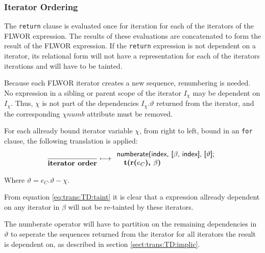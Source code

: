 \subsubsection{Iterator Ordering}
The \texttt{return} clause is evaluated once for iteration for each of the iterators of the FLWOR expression. The
results of these evaluations are concatenated to form the result of the FLWOR expression. If the \texttt{return}
expression is not dependent on a iterator, its relational form will not have a representation for each
of the iterators iterations and will have to be tainted.

Because each FLWOR iterator creates a new sequence, renumbering is needed. No expression in a sibling or parent
scope of the iterator $I_{\chi}$ may be dependent on $I_{\chi}$. Thus, $\chi$ is not part of the dependencies
$I_{\chi}.\vartheta$ returned from the iterator, and the corresponding $\chi{numb}$ attribute must be removed. 

For each allready bound iterator variable $\chi$, from right to left, bound in an \texttt{for} clause,
the following translation is applied:
\begin{equation}
\frac{}{\mbox{\textbf{iterator order}}}
\longmapsto
\begin{array}{l}
\mbox{\textsf{numberate(index, [}}\beta\mbox{\textsf{, index], [}}\vartheta\mbox{\textsf{];}} \\ \quad
\mbox{\textbf{t(r(}}e_{C}\mbox{\textbf{), }}\beta\mbox{\textbf{)}}
\end{array}
\label{rule:trans:TD:itOrd}
\end{equation}

Where $\vartheta = e_{C}.\vartheta - \chi$.

From equation \ref{eq:trans:TD:taint} it is clear that a expression allready dependent on any iterator in
$\beta$ will not be re-tainted by these iterators.

The \textsf{numberate} operator will have to partition on the remaining dependencies in $\vartheta$ to seperate
the sequences returned from the iterator for all iterators the result is dependent on, as described in section
\ref{sect:trans:TD:implic}.

